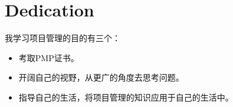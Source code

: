 \chapter*{Dedication}

我学习项目管理的目的有三个：
\begin{itemize}
\item 考取PMP证书。
\item 开阔自己的视野，从更广的角度去思考问题。
\item 指导自己的生活，将项目管理的知识应用于自己的生活中。
\end{itemize}
